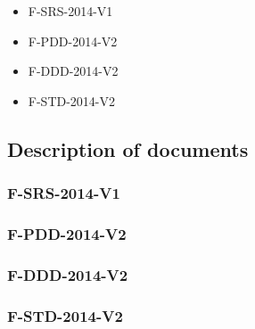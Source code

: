 \begin{itemize}
\item F-SRS-2014-V1
\item F-PDD-2014-V2
\item F-DDD-2014-V2
\item F-STD-2014-V2
\end{itemize}


\subsection{Description of documents}
\subsubsection{F-SRS-2014-V1}

\subsubsection{F-PDD-2014-V2}

\subsubsection{F-DDD-2014-V2}

\subsubsection{F-STD-2014-V2}




